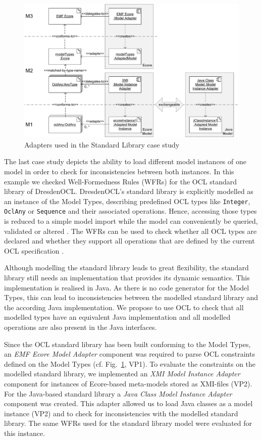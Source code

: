 \begin{figure}[!t]
	\centering
		\includegraphics[width=1.00\textwidth]{figures/casestudy03.pdf}
	\caption{Adapters used in the Standard Library case study}
	\label{fig:casestudy03}
\end{figure}

The last case study depicts the ability to load different model instances of one model 
in order to check for inconsistencies between both instances. In this example we 
checked Well-Formedness Rules (WFRs) for the OCL standard library of DresdenOCL. 
DresdenOCL's standard library is explicitly modelled as 
an instance of the Model Types, describing predefined OCL types like \texttt{Integer}, 
\texttt{OclAny} or \texttt{Sequence} and their associated operations. 
Hence, accessing those types is reduced to a simple model 
import while the model can conveniently be queried, validated or altered 
\cite{braeuerOCL07}. The WFRs can be used to check whether all OCL types are 
declared and whether they support all operations that are defined by the 
current OCL specification \cite{spec:OCL2-2}.

Although modelling the standard library leads to great flexibility, the standard library 
still needs an implementation that provides its dynamic semantics. 
This implementation is realised in Java. As there is no code generator for the Model Types, this can lead to inconsistencies between 
the modelled standard library and the according Java implementation.
We propose to use OCL to check that all modelled types have an equivalent Java 
implementation and all modelled operations are also present in the Java interfaces.

Since the OCL standard library has been built conforming to the Model Types, an
\textit{EMF Ecore Model Adapter} component was required to parse OCL constraints
defined on the Model Types (cf. Fig.~\ref{fig:casestudy03}, VP1).
To evaluate the constraints on the modelled standard library,
we implemented an \textit{XMI Model Instance Adapter} component for instances of 
Ecore-based meta-models stored as XMI-files (VP2). For the Java-based standard library
a \emph{Java Class Model Instance Adapter} component was created. This adapter
allowed us to load Java classes as a model instance (VP2)
and to check for inconsistencies with the modelled standard library. The same WFRs 
used for the standard library model were evaluated for this instance. 

